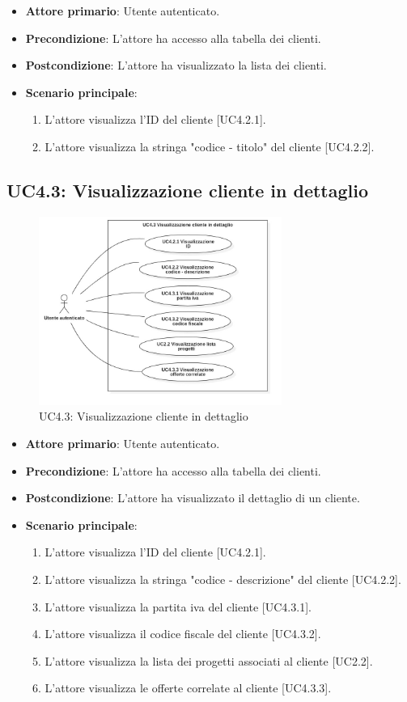 \begin{itemize}
\item \textbf{Attore primario}: Utente autenticato.
\item \textbf{Precondizione}: L'attore ha accesso alla tabella dei clienti.
\item \textbf{Postcondizione}: L'attore ha visualizzato la lista dei clienti.
\item \textbf{Scenario principale}: 
\begin{enumerate}
\item L'attore visualizza l'ID del cliente [UC4.2.1].
\item L'attore visualizza la stringa "codice - titolo" del cliente [UC4.2.2].
\end{enumerate}
\end{itemize}

\pagebreak

\subsection{UC4.3: Visualizzazione cliente in dettaglio}
\begin{figure}[!h]
\centering
\includegraphics[width=300px]{../images/UC/.jpeg/UC4.3.0-visualizzazioneDettaglioCliente.jpg}
\caption{UC4.3: Visualizzazione cliente in dettaglio}
\end{figure}

\begin{itemize}
\item \textbf{Attore primario}: Utente autenticato.
\item \textbf{Precondizione}: L'attore ha accesso alla tabella dei clienti.
\item \textbf{Postcondizione}: L'attore ha visualizzato il dettaglio di un cliente.
\item \textbf{Scenario principale}: 
\begin{enumerate}
\item L'attore visualizza l'ID del cliente [UC4.2.1].
\item L'attore visualizza la stringa "codice - descrizione" del cliente [UC4.2.2].
\item L'attore visualizza la partita iva del cliente [UC4.3.1].
\item L'attore visualizza il codice fiscale del cliente [UC4.3.2].
\item L'attore visualizza la lista dei progetti associati al cliente [UC2.2].
\item L'attore visualizza le offerte correlate al cliente [UC4.3.3].
\end{enumerate}
\end{itemize}

